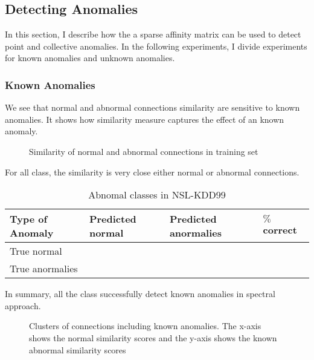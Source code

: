 \subsection{Detecting Anomalies}
\label{subsec:detectinganomalies}
In this section, I describe how the a sparse affinity matrix can be used to detect point and collective anomalies. 
In the following experiments, I divide experiments for known anomalies and unknown anomalies. 

\subsubsection{Known Anomalies}
We see that normal and abnormal connections similarity are sensitive to known anomalies. 
It shows how similarity measure captures the effect of an known anomaly. 

\begin{figure}[htb2]
\begin{center}
\end{center}
\caption{Similarity of normal and abnormal connections in training set} %
\label{fig:refSingleRobot1}
\end{figure}
For all class, the similarity is very close either normal or abnormal connections. 
\begin{table}[h]
\begin{center}
\begin{tabular}{| l | l | l | p{5cm} |}
\hline
Type of Anomaly & Predicted normal & Predicted anormalies & $\%$ correct\\
\hline
True normal &  &  & \\
\hline
True anormalies &  &  & \\
\hline
\end{tabular}
\end{center}
\caption{Abnomal classes in NSL-KDD99}
\label{fig:refSingleRobot1}
\end{table}

In summary, all the class successfully detect known anomalies in spectral approach. 

\begin{figure}[htb2]
\begin{center}
\end{center}
\caption{Clusters of connections including known anomalies. The x-axis shows the normal similarity scores and the y-axis shows the known abnormal similarity scores}
\label{fig:refSingleRobot1}
\end{figure}

